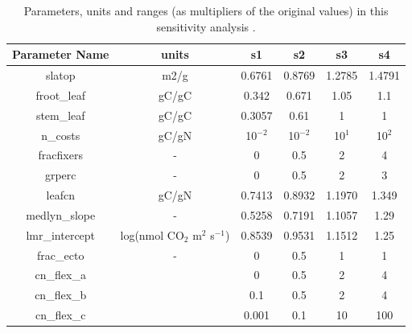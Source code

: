 \documentclass[draft,linenumbers]{agujournal}
\begin{document}
\begin{table}
\begin{center}
\begin{tabular}{ |c|c|c|c|c|c| } 
 \hline
 Parameter Name & units & s1 &s2 & s3 & s4\\
  \hline
 slatop & m2/g & 0.6761 & 0.8769 &1.2785 &1.4791\\ 
 froot\_leaf & gC/gC &  0.342 &0.671 &1.05 & 1.1\\
 stem\_leaf  & gC/gC & 0.3057 &0.61 &1 &1\\ 
 n\_costs    & gC/gN &10$^{-2}$ &10$^{-2}$&  10$^{1}$& 10$^{2}$\\
 fracfixers  & - & 0 &0.5 & 2 & 4 \\
  grperc  &  - &0 & 0.5& 2 & 3\\
  leafcn  & gC/gN &0.7413 & 0.8932 & 1.1970  & 1.349\\
  
     medlyn\_slope  &- &0.5258 & 0.7191 & 1.1057  &1.29\\
      lmr\_intercept &log(nmol CO$_{2}$ m$^{2}$ s$^{-1}$) &0.8539 & 0.9531 & 1.1512& 1.25\\
      frac\_ecto &- & 0 &0.5& 1 & 1 \\
      cn\_flex\_a & &0 &0.5 & 2  &4\\
      cn\_flex\_b & &0.1 & 0.5 & 2  & 4\\
      cn\_flex\_c & &0.001 & 0.1 & 10 & 100\\
\hline
\end{tabular}
\end{center}
\caption{Parameters, units and ranges (as multipliers of the original values) in this sensitivity analysis .}
\label{table_ranges}
\end{table}
\end{document}
